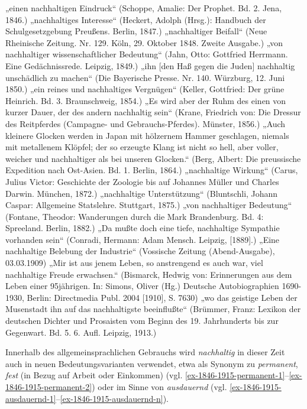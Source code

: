 \documentclass[
    german,
    a4paper,%
    12pt,%
    oneside,%
    toc=bibliography,
    final,
]{scrartcl}
\begin{document}
\begin{exe}
\ex \label{ex-1846-1915-allg-first} „einen nachhaltigen Eindruck“ (Schoppe, Amalie: Der Prophet. Bd. 2. Jena, 1846.)
\ex „nachhaltiges Interesse“ (Heckert, Adolph (Hrsg.): Handbuch der Schulgesetzgebung Preußens. Berlin, 1847.)
\ex „nachhaltiger Beifall“ (Neue Rheinische Zeitung. Nr. 129. Köln, 29. Oktober 1848. Zweite Ausgabe.)
\ex „von nachhaltiger wissenschaftlicher Bedeutung“ (Jahn, Otto: Gottfried Herrmann. Eine Gedächnissrede. Leipzig, 1849.)
\ex „ihn [den Haß gegen die Juden] nachhaltig unschädlich zu machen“ (Die Bayerische Presse. Nr. 140. Würzburg, 12. Juni 1850.)
\ex „ein reines und nachhaltiges Vergnügen“ (Keller, Gottfried: Der grüne Heinrich. Bd. 3. Braunschweig, 1854.)
\ex „Es wird aber der Ruhm des einen von kurzer Dauer, der des andern nachhaltig sein“ (Krane, Friedrich von: Die Dressur des Reitpferdes (Campagne- und Gebrauchs-Pferdes). Münster, 1856.)
\ex „Auch kleinere Glocken werden in Japan mit hölzernem Hammer geschlagen, niemals mit metallenem Klöpfel; der so erzeugte Klang ist nicht so hell, aber voller, weicher und nachhaltiger als bei unseren Glocken.“ (Berg, Albert: Die preussische Expedition nach Ost-Asien. Bd. 1. Berlin, 1864.)
\ex „nachhaltige Wirkung“ (Carus, Julius Victor: Geschichte der Zoologie bis auf Johannes Müller und Charles Darwin. München, 1872.)
\ex „nachhaltige Unterstützung“ (Bluntschli, Johann Caspar: Allgemeine Statslehre. Stuttgart, 1875.)
\ex „von nachhaltiger Bedeutung“ (Fontane, Theodor: Wanderungen durch die Mark Brandenburg. Bd. 4: Spreeland. Berlin, 1882.)
\ex „Da mußte doch eine tiefe, nachhaltige Sympathie vorhanden sein“ (Conradi, Hermann: Adam Mensch. Leipzig, [1889].)
\ex „Eine nachhaltige Belebung der Industrie“ (Vossische Zeitung (Abend-Ausgabe), 03.03.1909)
\ex „Mir ist aus jenem Leben, so anstrengend es auch war, viel nachhaltige Freude erwachsen.“ (Bismarck, Hedwig von: Erinnerungen aus dem Leben einer 95jährigen. In: Simons, Oliver (Hg.) Deutsche Autobiographien 1690-1930, Berlin: Directmedia Publ. 2004 [1910], S. 7630)
\ex \label{ex-1846-1915-allg-last} „wo das geistige Leben der Musenstadt ihn auf das nachhaltigste beeinflußte“ (Brümmer, Franz: Lexikon der deutschen Dichter und Prosaisten vom Beginn des 19. Jahrhunderts bis zur Gegenwart. Bd. 5. 6. Aufl. Leipzig, 1913.)
\end{exe}

Innerhalb des allgemeinsprachlichen Gebrauchs wird \textit{nachhaltig} in dieser Zeit auch in neuen Bedeutungsvarianten verwendet, etwa als Synonym zu \textit{permanent}, \textit{fest} (in Bezug auf Arbeit oder Einkommen) (vgl. \ref{ex-1846-1915-permanent-1}–\ref{ex-1846-1915-permanent-2}) oder im Sinne von \textit{ausdauernd} (vgl. \ref{ex-1846-1915-ausdauernd-1}–\ref{ex-1846-1915-ausdauernd-n}).
\end{document}
